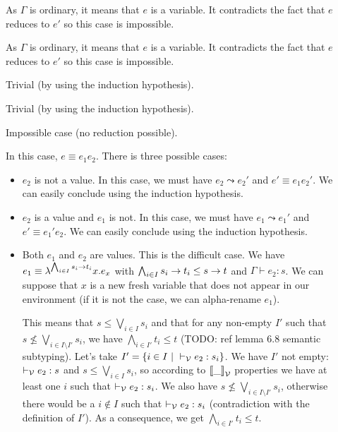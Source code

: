 \documentclass[a4paper]{article}
\theoremstyle{definition}
\begin{document}
        \begin{description}
          \item[] As $\Gamma$ is ordinary, it means that $e$ is a variable.
          It contradicts the fact that $e$ reduces to $e'$ so this case is impossible.
          \item[] As $\Gamma$ is ordinary, it means that $e$ is a variable.
          It contradicts the fact that $e$ reduces to $e'$ so this case is impossible. 
          \item[] Trivial (by using the induction hypothesis).
          \item[] Trivial (by using the induction hypothesis).
          \item[] Impossible case (no reduction possible).
          \item[] In this case, $e\equiv e_1 e_2$.
          There is three possible cases:
          \begin{itemize}
            \item $e_2$ is not a value. In this case, we must have $e_2\leadsto e_2'$
            and $e'\equiv e_1 e_2'$. We can easily conclude using the induction hypothesis.
            \item $e_2$ is a value and $e_1$ is not. In this case, we must have $e_1\leadsto e_1'$
            and $e'\equiv e_1' e_2$. We can easily conclude using the induction hypothesis.
            \item Both $e_1$ and $e_2$ are values. This is the difficult case.
            We have $e_1\equiv \lambda^{\bigwedge_{i\in I}s_i\to t_i}x.e_x$
            with $\bigwedge_{i\in I}s_i\to t_i \leq s\to t$ and $\Gamma \vdash e_2:s$.
            We can suppose that $x$ is a new fresh variable that does not appear in our environment
            (if it is not the case, we can alpha-rename $e_1$).

            This means that $s\leq \bigvee_{i\in I} s_i$ and that for any non-empty $I'$ such that
            $s\not\leq \bigvee_{i\in I\setminus I'} s_i$, we have $\bigwedge_{i\in I'} t_i \leq t$
            (TODO: ref lemma 6.8 semantic subtyping). Let's take $I'=\{i\in I~|~ \vdash_{\mathcal{V}} e_2:s_i\}$.
            We have $I'$ not empty: $\vdash_{\mathcal{V}} e_2:s$ and $s\leq \bigvee_{i\in I} s_i$, so according to
            ${\llbracket \_ \rrbracket}_{\mathcal{V}}$ properties we have at least one $i$ such that $\vdash_{\mathcal{V}} e_2:s_i$.
            We also have $s\not\leq \bigvee_{i\in I\setminus I'} s_i$, otherwise there would be a $i\not\in I$
            such that $\vdash_{\mathcal{V}} e_2: s_i$ (contradiction with the definition of $I'$).
            As a consequence, we get $\bigwedge_{i\in I'} t_i \leq t$.


\end{itemize}
\end{description}
\end{document}
